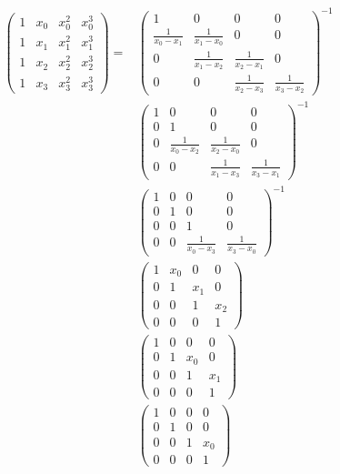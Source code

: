 \documentclass[11pt]{article}
\begin{document}
{\begin{align*}
\left(\begin{matrix}1 & x_{0} & x_{0}^{2} & x_{0}^{3}\\1 & x_{1} & x_{1}^{2} & x_{1}^{3}\\1 & x_{2} & x_{2}^{2} & x_{2}^{3}\\1 & x_{3} & x_{3}^{2} & x_{3}^{3}\end{matrix}\right)
=& \left(\begin{matrix}1&0&0&0\\\frac{1}{x_{0}-x_{1}}&\frac{1}{x_{1}-x_{0}}&0&0\\0&\frac{1}{x_{1}-x_{2}}&\frac{1}{x_{2}-x_{1}}&0\\0&0&\frac{1}{x_{2}-x_{3}}&\frac{1}{x_{3}-x_{2}}\end{matrix}\right)^{-1} \\
 & \left(\begin{matrix}1&0&0&0\\0&1&0&0\\0&\frac{1}{x_{0}-x_{2}}&\frac{1}{x_{2}-x_{0}}&0\\0&0&\frac{1}{x_{1}-x_{3}}&\frac{1}{x_{3}-x_{1}}\end{matrix}\right)^{-1} \\
 & \left(\begin{matrix}1&0&0&0\\0&1&0&0\\0&0&1&0\\0&0&\frac{1}{x_{0}-x_{3}}&\frac{1}{x_{3}-x_{0}}\end{matrix}\right)^{-1} \\
 & \left(\begin{matrix}1&x_{0}&0&0\\0&1&x_{1}&0\\0&0&1&x_{2}\\0&0&0&1\end{matrix}\right) \\
 & \left(\begin{matrix}1&0&0&0\\0&1&x_{0}&0\\0&0&1&x_{1}\\0&0&0&1\end{matrix}\right) \\
 & \left(\begin{matrix}1&0&0&0\\0&1&0&0\\0&0&1&x_{0}\\0&0&0&1\end{matrix}\right) 
\end{align*}

}
\end{document}
